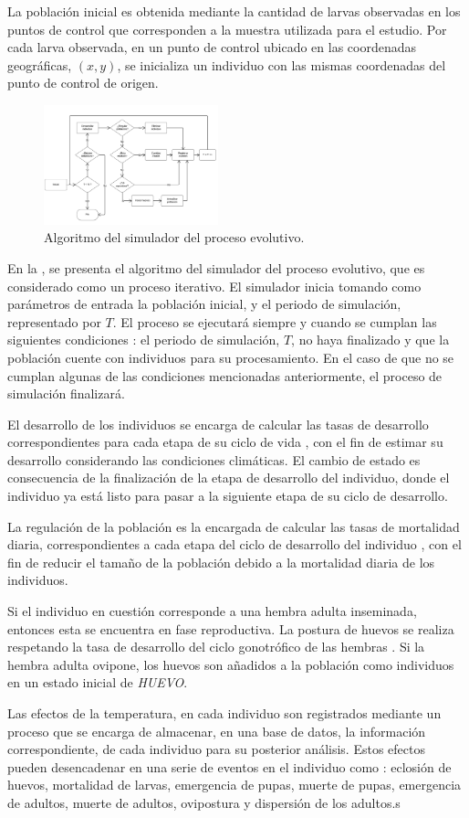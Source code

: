 La población inicial es obtenida mediante la cantidad de larvas observadas en los puntos de
control que corresponden a la muestra utilizada para el estudio. Por cada larva observada,
en un punto de control ubicado en las coordenadas geográficas, $(x, y)$, se inicializa un individuo
con las mismas coordenadas del punto de control de origen.

\begin{figure}[!t]
\centering
\includegraphics[width=0.45\textwidth]{graphics/algoritmo-evolutivo.png}
\caption{\label{fig:cap-5-alg-evolutivo} Algoritmo del simulador del proceso evolutivo.}
\end{figure}

En la , se presenta el algoritmo del simulador del proceso
evolutivo, que es considerado como un proceso iterativo. El simulador inicia tomando como
parámetros de entrada la población inicial, y el periodo de simulación, representado por $T$. El
proceso se ejecutará siempre y cuando se cumplan las siguientes condiciones : el periodo de
simulación, $T$, no haya finalizado y que la población cuente con individuos para su procesamiento.
En el caso de que no se cumplan algunas de las condiciones mencionadas anteriormente, el proceso
de simulación finalizará.

El desarrollo de los individuos se encarga de calcular las tasas de desarrollo correspondientes
para cada etapa de su ciclo de vida , con el fin de estimar su desarrollo considerando las condiciones climáticas. El cambio de
estado es consecuencia de la finalización de la etapa de desarrollo del individuo, donde el
individuo ya está listo para pasar a la siguiente etapa de su ciclo de desarrollo.


La regulación de la población es la encargada de calcular las tasas de mortalidad diaria,
correspondientes a cada etapa del ciclo de desarrollo del individuo
, con el fin de reducir el tamaño de la población debido a la
mortalidad diaria de los individuos.

Si el individuo en cuestión corresponde a una hembra adulta inseminada, entonces esta se encuentra
en fase reproductiva. La postura de huevos se realiza respetando la tasa de desarrollo del ciclo
gonotrófico de las hembras . Si la hembra
adulta ovipone, los huevos son añadidos a la población como individuos en un estado inicial de
\textit{HUEVO}.

Las efectos de la temperatura, en cada individuo son registrados mediante un proceso que se
encarga de almacenar, en una base de datos, la información correspondiente, de cada individuo para
su posterior análisis. Estos efectos pueden desencadenar en una serie de eventos en el individuo
como : eclosión de huevos, mortalidad de larvas, emergencia de pupas, muerte de pupas, emergencia
de adultos, muerte de adultos, ovipostura y dispersión de los adultos.s

